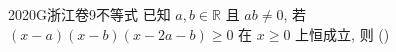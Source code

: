 
\begin{problem}{2020}{G}{浙江卷}{9}{不等式}
已知 $ a,b\in\mathbb{R} $ 且 $ ab\neq 0 $, 若 $ (x-a)(x-b)(x-2a-b)\geq 0 $ 在 $ x\geq 0 $ 上恒成立, 则 (\hspace{1cm})

\begin{choices}
\end{choices}
\end{problem}

\begin{answer}

\end{answer}

\begin{solutions}

\end{solutions}
